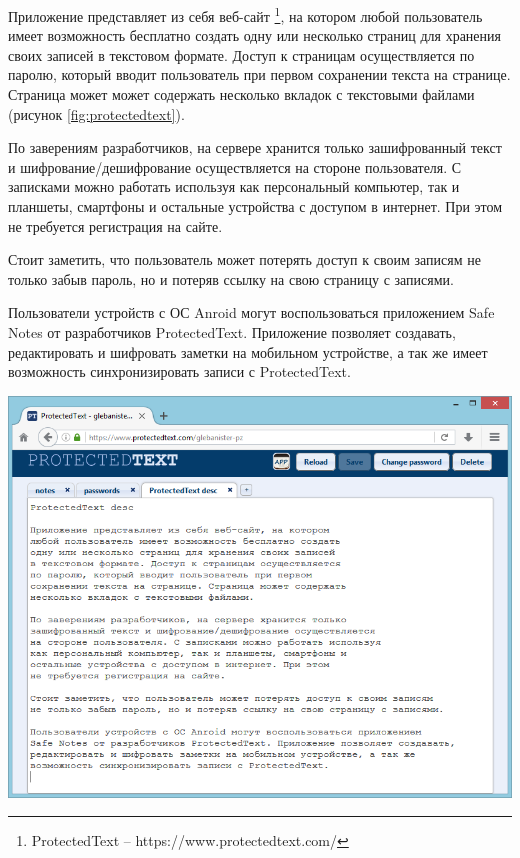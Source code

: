 
Приложение представляет из себя веб-сайт
\footnote{ProtectedText -- https://www.protectedtext.com/},
на котором любой пользователь имеет возможность бесплатно создать
одну или несколько страниц для хранения своих записей в текстовом
формате. Доступ к страницам осуществляется по паролю, который
вводит пользователь при первом сохранении текста на странице.
Страница может может содержать несколько вкладок
с текстовыми файлами (рисунок \ref{fig:protectedtext}).

По заверениям разработчиков, на сервере хранится только зашифрованный
текст и шифрование/дешифрование осуществляется на стороне пользователя.
С записками можно работать используя как персональный компьютер,
так и планшеты, смартфоны и остальные устройства с доступом в интернет.
При этом не требуется регистрация на сайте.

Стоит заметить, что пользователь может потерять доступ к своим записям
не только забыв пароль, но и потеряв ссылку на свою страницу с записями.

Пользователи устройств с ОС Anroid могут воспользоваться приложением
Safe Notes от разработчиков ProtectedText. Приложение позволяет создавать,
редактировать и шифровать заметки на мобильном устройстве, а так же
имеет возможность синхронизировать записи с ProtectedText.

\noindent
\begin{minipage}{\textwidth}
  \vspace{3.5mm}
  \centering
  \includegraphics[scale=0.6]{./pics/protectedtext-main.png}
  \label{fig:protectedtext}
  \vspace{3.5mm}
\end{minipage}


